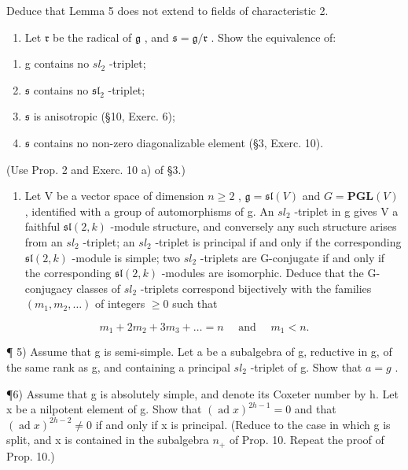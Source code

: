 Deduce that Lemma 5 does not extend to fields of characteristic 2.

\begin{enumerate}
\def\labelenumi{\arabic{enumi})}
\setcounter{enumi}{2}
\tightlist
\item
  Let \(\mathfrak{r}\) be the radical of \(\mathfrak{g}\) , and \(\mathfrak{s} = \mathfrak{g} / \mathfrak{r}\) . Show the equivalence of:
\end{enumerate}

\begin{enumerate}
\def\labelenumi{(\roman{enumi})}
\item
  g contains no \(sl_{2}\) -triplet;
\item
  \(\mathfrak{s}\) contains no \(\mathfrak{sl}_2\) -triplet;
\item
  \(\mathfrak{s}\) is anisotropic (§10, Exerc. 6);
\item
  \(\mathfrak{s}\) contains no non-zero diagonalizable element (§3, Exerc. 10).
\end{enumerate}

(Use Prop. 2 and Exerc. 10 a) of §3.)

\begin{enumerate}
\def\labelenumi{\arabic{enumi})}
\setcounter{enumi}{3}
\tightlist
\item
  Let V be a vector space of dimension \(n \geq 2\) , \(\mathfrak{g} = \mathfrak{sl}(V)\) and \(G = \mathbf{PGL}(V)\) , identified with a group of automorphisms of g. An \(sl_{2}\) -triplet in g gives V a faithful \(\mathfrak{sl}(2, k)\) -module structure, and conversely any such structure arises from an \(sl_{2}\) -triplet; an \(sl_{2}\) -triplet is principal if and only if the corresponding \(\mathfrak{sl}(2, k)\) -module is simple; two \(sl_{2}\) -triplets are G-conjugate if and only if the corresponding \(\mathfrak{sl}(2, k)\) -modules are isomorphic. Deduce that the G-conjugacy classes of \(sl_{2}\) -triplets correspond bijectively with the families \((m_{1}, m_{2}, \ldots)\) of integers \(\geq 0\) such that
\end{enumerate}

\[
m _ {1} + 2 m _ {2} + 3 m _ {3} + \dots = n \quad \text { and } \quad m _ {1} <   n.
\]

¶ 5) Assume that g is semi-simple. Let a be a subalgebra of g, reductive in g, of the same rank as g, and containing a principal \(sl_{2}\) -triplet of g. Show that \(a = g\) .

¶6) Assume that g is absolutely simple, and denote its Coxeter number by h. Let x be a nilpotent element of g. Show that \((\operatorname{ad} x)^{2h-1} = 0\) and that \((\operatorname{ad} x)^{2h-2} \neq 0\) if and only if x is principal. (Reduce to the case in which g is split, and x is contained in the subalgebra \(n_{+}\) of Prop. 10. Repeat the proof of Prop. 10.)

